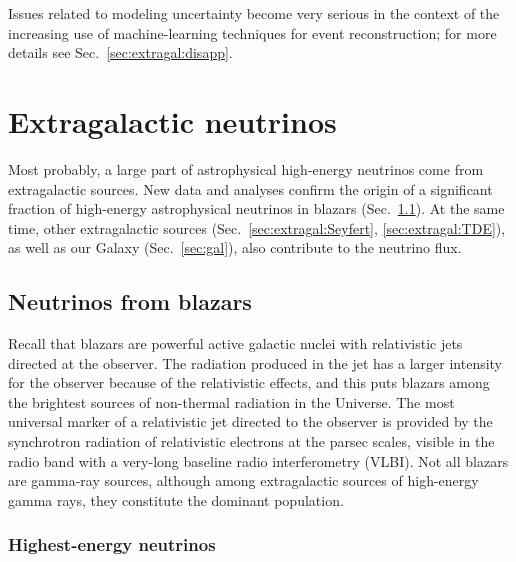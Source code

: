 \documentclass[a4paper,noshowpacs,noshowkeys,floatfix,twocolumn,preprintnumbers,nofootinbib]{revtex4-2}
\begin{document}
Issues related to modeling uncertainty become very serious in the context of the increasing use of machine-learning techniques for event reconstruction; for more details see Sec.~\ref{sec:extragal:disapp}.

\section{Extragalactic neutrinos}
\label{sec:extragal}
Most probably, a large part of astrophysical high-energy neutrinos come from extragalactic sources.
New data and analyses confirm the origin of a significant fraction of high-energy astrophysical neutrinos in blazars (Sec.~\ref{sec:extragal:blazars}). At the same time, other extragalactic sources (Sec.~\ref{sec:extragal:Seyfert}, \ref{sec:extragal:TDE}), as well as our Galaxy (Sec.~\ref{sec:gal}), also contribute to the neutrino flux. 

\subsection{Neutrinos from blazars}
\label{sec:extragal:blazars}
Recall that blazars are powerful active galactic nuclei with relativistic jets directed at the observer. The radiation produced in the jet has a larger intensity  for the observer because of the relativistic effects, and this puts blazars among the brightest sources of non-thermal radiation in the Universe. The most universal marker of a relativistic jet directed to the observer is provided by the synchrotron radiation of relativistic electrons at the parsec scales, visible in the radio band with a very-long baseline radio interferometry (VLBI). Not all blazars are gamma-ray sources, although among extragalactic sources of high-energy gamma rays, they constitute the dominant population.

\subsubsection{Highest-energy neutrinos}
\label{sec:extragal:blazars:200+}
\end{document}
